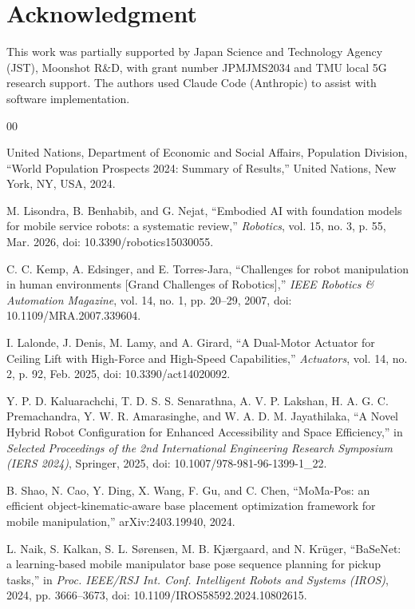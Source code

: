 \documentclass[conference]{IEEEtran}
\begin{document}
\section*{Acknowledgment}
This work was partially supported by Japan Science and Technology Agency (JST),
Moonshot R\&D, with grant number JPMJMS2034 and TMU local 5G research support.
The authors used Claude Code (Anthropic) to assist with software implementation.

{\scriptsize
\begin{thebibliography}{00}

United Nations, Department of Economic and Social Affairs, Population Division, ``World Population Prospects 2024: Summary of Results,'' United Nations, New York, NY, USA, 2024.

M. Lisondra, B. Benhabib, and G. Nejat, ``Embodied AI with foundation models for mobile service robots: a systematic review,'' \textit{Robotics}, vol. 15, no. 3, p. 55, Mar. 2026, doi: 10.3390/robotics15030055.

C. C. Kemp, A. Edsinger, and E. Torres-Jara, ``Challenges for robot manipulation in human environments [Grand Challenges of Robotics],'' \textit{IEEE Robotics \& Automation Magazine}, vol. 14, no. 1, pp. 20--29, 2007, doi: 10.1109/MRA.2007.339604.

I. Lalonde, J. Denis, M. Lamy, and A. Girard, ``A Dual-Motor Actuator for Ceiling Lift with High-Force and High-Speed Capabilities,'' \textit{Actuators}, vol. 14, no. 2, p. 92, Feb. 2025, doi: 10.3390/act14020092.

Y. P. D. Kaluarachchi, T. D. S. S. Senarathna, A. V. P. Lakshan, H. A. G. C. Premachandra, Y. W. R. Amarasinghe, and W. A. D. M. Jayathilaka, ``A Novel Hybrid Robot Configuration for Enhanced Accessibility and Space Efficiency,'' in \textit{Selected Proceedings of the 2nd International Engineering Research Symposium (IERS 2024)}, Springer, 2025, doi: 10.1007/978-981-96-1399-1\_22.

B. Shao, N. Cao, Y. Ding, X. Wang, F. Gu, and C. Chen, ``MoMa-Pos: an efficient object-kinematic-aware base placement optimization framework for mobile manipulation,'' arXiv:2403.19940, 2024.

L. Naik, S. Kalkan, S. L. S{\o}rensen, M. B. Kj{\ae}rgaard, and N. Kr{\"u}ger, ``BaSeNet: a learning-based mobile manipulator base pose sequence planning for pickup tasks,'' in \textit{Proc. IEEE/RSJ Int. Conf. Intelligent Robots and Systems (IROS)}, 2024, pp. 3666--3673, doi: 10.1109/IROS58592.2024.10802615.


\end{thebibliography}}
\end{document}
